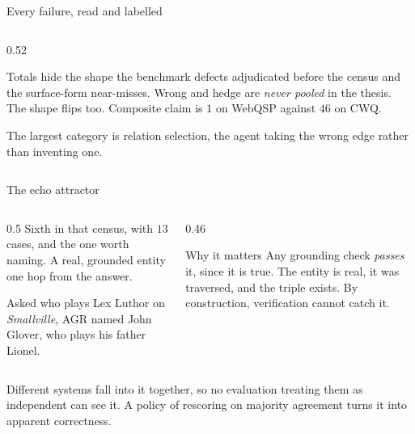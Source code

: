 \begin{frame}{Every failure, read and labelled}
\begin{columns}[T]
\begin{column}{0.52\textwidth}
\begin{block}{Totals hide the shape}
        the benchmark defects adjudicated before the census and the
        surface-form near-misses. Wrong and hedge are \emph{never pooled}
        in the thesis. The shape flips too. Composite claim is $1$ on
        WebQSP against $46$ on CWQ.
      \end{block}
      \vspace{1mm}
      {\small\agrraggedright The largest category is \alert{relation
      selection}, the agent taking the wrong edge rather than inventing
      one.\par}
    \end{column}
  \end{columns}
\end{frame}

\begin{frame}{The echo attractor}
  \begin{columns}[T]
    \begin{column}{0.5\textwidth}
      \agrraggedright
      Sixth in that census, with $13$ cases, and the one worth naming. A
      real, \alert{grounded} entity \alert{one hop} from the answer.
      \vspace{2mm}

      {\small Asked who plays Lex Luthor on \emph{Smallville}, AGR named
      John Glover, who plays his father Lionel.\par}
    \end{column}
    \begin{column}{0.46\textwidth}
      \begin{block}{Why it matters}
        \agrraggedright
        Any grounding check \emph{passes} it, since it is true. The entity
        is real, it was traversed, and the triple exists. By construction,
        verification cannot catch it.
      \end{block}
    \end{column}
  \end{columns}
  \vspace{2mm}
  {\agrraggedright Different systems fall into it \alert{together}, so no
  evaluation treating them as independent can see it. A policy of
  rescoring on majority agreement turns it into apparent
  \alert{correctness}.\par}
\end{frame}

